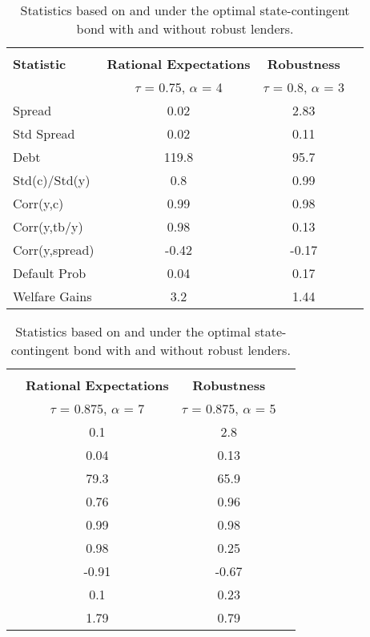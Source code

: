 \begin{table}[!hbtp]\centering\small 
\caption{Statistics based on \citet{Chatty} and \citet{PouzoPresno2016} under the optimal state-contingent bond with and without robust lenders.} \label{table:optimal_structure}
\begin{tabular}{@{}lccc@{}}\toprule
  & \multicolumn{2}{c}{\citet{Chatty}} \\\cmidrule{2-3}
\textbf{Statistic} & \textbf{Rational Expectations} & \textbf{Robustness}\\
& $\tau$ = 0.75, $\alpha$ = 4 & $\tau$ = 0.8, $\alpha$ = 3 &\\\midrule
Spread                   &   0.02          & 2.83                        \\
Std Spread               &   0.02          & 0.11                     \\
Debt                     &    119.8        & 95.7                 \\
Std(c)/Std(y)            &     0.8        & 0.99                   \\
Corr(y,c)                &     0.99       & 0.98                   \\
Corr(y,tb/y)             &     0.98      & 0.13                  \\
Corr(y,spread)           &   -0.42         & -0.17                      \\
Default Prob             &  0.04           & 0.17                      \\
Welfare Gains            & 3.2             & 1.44                    \\
  \bottomrule
\end{tabular}%
\begin{tabular}{@{}lccc@{}}\toprule
  & \multicolumn{2}{c}{\citet{PouzoPresno2016}} \\\cmidrule{2-3}
  & \textbf{Rational Expectations} & \textbf{Robustness}  \\
& $\tau$ = 0.875, $\alpha$ = 7 & $\tau$ = 0.875, $\alpha$ = 5 &\\\midrule
&   0.1          &       2.8        \\
&   0.04          &         0.13            \\
&   79.3         &           65.9           \\
&   0.76         &           0.96          \\
&   0.99        &           0.98        \\
&   0.98        &           0.25      \\
&   -0.91        &          -0.67       \\
&  0.1             &    0.23                  \\
& 1.79              & 0.79                 \\
  \bottomrule 
\end{tabular}
\end{table}




